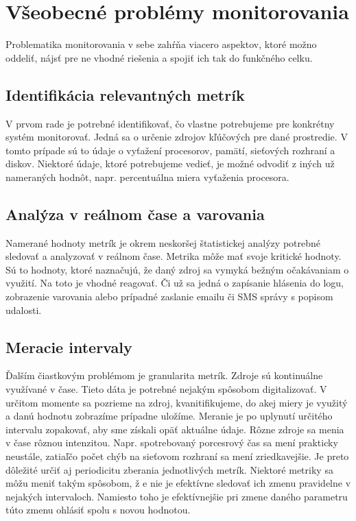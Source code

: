 \documentclass[printed,11pt,twoside,color,cover,table]{fithesis3}
\begin{document}
\section{Všeobecné problémy monitorovania}
Problematika monitorovania v sebe zahŕňa viacero aspektov, ktoré možno oddeliť, nájsť pre ne vhodné riešenia a spojiť ich tak do funkčného celku. 

\subsection{Identifikácia relevantných metrík}
V prvom rade je potrebné identifikovať, čo vlastne potrebujeme pre konkrétny systém monitorovať. Jedná sa o určenie zdrojov kľúčových pre dané prostredie. V tomto prípade sú to údaje o vyťažení
procesorov, pamätí, sieťových rozhraní a diskov. Niektoré údaje, ktoré potrebujeme vedieť, je možné odvodiť z iných už nameraných hodnôt, napr. percentuálna miera vyťaženia procesora. 

\subsection{Analýza v reálnom čase a varovania}
Namerané hodnoty metrík je okrem neskoršej štatistickej analýzy potrebné sledovať a analyzovať v reálnom čase. Metrika môže mať svoje kritické hodnoty. Sú to hodnoty, ktoré naznačujú, že daný zdroj sa vymyká bežným očakávaniam o využití.
Na toto je vhodné reagovať. Či už sa jedná o zapísanie hlásenia do logu, zobrazenie varovania alebo prípadné zaslanie emailu či SMS správy s popisom udalosti.

\subsection{Meracie intervaly}
Ďalším čiastkovým problémom je granularita metrík. Zdroje sú kontinuálne využívané v čase. Tieto dáta je potrebné nejakým spôsobom digitalizovať. V určitom momente sa pozrieme na zdroj, kvanitifikujeme, do akej miery je využitý a danú
hodnotu zobrazíme prípadne uložíme. Meranie je po uplynutí určitého intervalu zopakovať, aby sme získali opäť aktuálne údaje. Rôzne zdroje sa menia v čase rôznou intenzitou. Napr. spotrebovaný porcesrový čas
sa mení prakticky neustále, zatiaľčo počet chýb na sieťovom rozhraní sa mení zriedkavejšie. Je preto dôležité určiť aj periodicitu zberania jednotlivých metrík. Niektoré metriky sa môžu meniť takým spôsobom, ž
e nie je efektívne sledovať ich zmenu pravidelne v nejakých intervaloch. Namiesto toho je efektívnejšie pri zmene daného parametru túto zmenu ohlásiť spolu s novou hodnotou.
\end{document}
